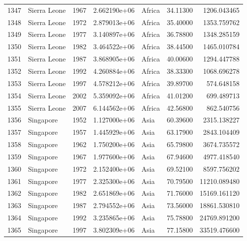 \documentclass[
  letterpaper,
  DIV=11,
  numbers=noendperiod]{scrreprt}
\begin{document}
\begin{tabular}{llrrlrr}
1347 &              Sierra Leone &  1967 &  2.662190e+06 &    Africa &  34.11300 &    1206.043465 \\
1348 &              Sierra Leone &  1972 &  2.879013e+06 &    Africa &  35.40000 &    1353.759762 \\
1349 &              Sierra Leone &  1977 &  3.140897e+06 &    Africa &  36.78800 &    1348.285159 \\
1350 &              Sierra Leone &  1982 &  3.464522e+06 &    Africa &  38.44500 &    1465.010784 \\
1351 &              Sierra Leone &  1987 &  3.868905e+06 &    Africa &  40.00600 &    1294.447788 \\
1352 &              Sierra Leone &  1992 &  4.260884e+06 &    Africa &  38.33300 &    1068.696278 \\
1353 &              Sierra Leone &  1997 &  4.578212e+06 &    Africa &  39.89700 &     574.648158 \\
1354 &              Sierra Leone &  2002 &  5.359092e+06 &    Africa &  41.01200 &     699.489713 \\
1355 &              Sierra Leone &  2007 &  6.144562e+06 &    Africa &  42.56800 &     862.540756 \\
1356 &                 Singapore &  1952 &  1.127000e+06 &      Asia &  60.39600 &    2315.138227 \\
1357 &                 Singapore &  1957 &  1.445929e+06 &      Asia &  63.17900 &    2843.104409 \\
1358 &                 Singapore &  1962 &  1.750200e+06 &      Asia &  65.79800 &    3674.735572 \\
1359 &                 Singapore &  1967 &  1.977600e+06 &      Asia &  67.94600 &    4977.418540 \\
1360 &                 Singapore &  1972 &  2.152400e+06 &      Asia &  69.52100 &    8597.756202 \\
1361 &                 Singapore &  1977 &  2.325300e+06 &      Asia &  70.79500 &   11210.089480 \\
1362 &                 Singapore &  1982 &  2.651869e+06 &      Asia &  71.76000 &   15169.161120 \\
1363 &                 Singapore &  1987 &  2.794552e+06 &      Asia &  73.56000 &   18861.530810 \\
1364 &                 Singapore &  1992 &  3.235865e+06 &      Asia &  75.78800 &   24769.891200 \\
1365 &                 Singapore &  1997 &  3.802309e+06 &      Asia &  77.15800 &   33519.476600 \\

\end{tabular}
\end{document}
